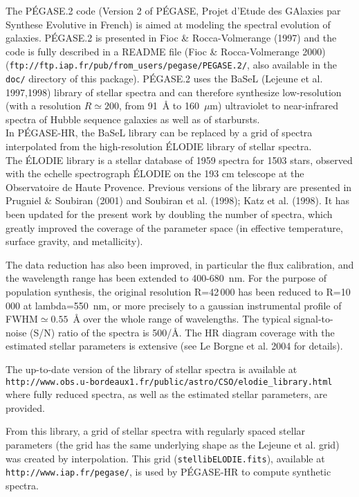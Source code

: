 \documentclass[11pt,fleqn]{article}
\begin{document}
The P\'EGASE.2 code (Version 2 of P\'EGASE, Projet d'Etude des GAlaxies
par Synthese Evolutive in French) is aimed at modeling the spectral
evolution of galaxies. P\'EGASE.2 is presented in Fioc \&
Rocca-Volmerange (1997) and the
code is fully described in a README file (Fioc \& Rocca-Volmerange 2000) 
(\texttt{ftp://ftp.iap.fr/pub/from\_users/pegase/PEGASE.2/}, also available in the \texttt{doc/} directory of this package).
P\'EGASE.2 uses the BaSeL (Lejeune et al. 1997,1998) library of stellar
spectra and can therefore synthesize low-resolution (with a resolution $R \simeq 200$, from 91~\AA{} to 160~$\mu$m)
ultraviolet to near-infrared spectra of Hubble sequence galaxies as
well as of starbursts.\\

In P\'EGASE-HR, the BaSeL library can be replaced by a grid of spectra
interpolated from the high-resolution \'ELODIE library of stellar spectra.\\

The \'ELODIE library is a stellar database of 1959 spectra for 1503
stars, observed with the echelle spectrograph \'ELODIE on the 193 cm
telescope at the Observatoire de Haute Provence. Previous versions of
the library are presented in Prugniel \& Soubiran (2001) and Soubiran
et al. (1998); Katz et al. (1998).  It has been updated for the
present work by doubling the number of spectra, which greatly improved
the coverage of the parameter space (in effective temperature, surface
gravity, and metallicity).

The data reduction has also been improved, in particular the flux
calibration, and the wavelength range has been extended to
400-680~nm.  For the purpose of population synthesis, the
original resolution R=42\,000 has been reduced to R=10\,000 at
lambda=550~nm, or more precisely to a gaussian instrumental
profile of FWHM$\simeq 0.55$~\AA{} over the whole range of
wavelengths.  The typical signal-to-noise (S/N) ratio of the
spectra is 500/\AA{}. The HR diagram coverage with the estimated
stellar parameters is extensive (see Le Borgne et al. 2004 for
details).

The up-to-date version of the library of stellar spectra is
available at\\
\texttt{http://www.obs.u-bordeaux1.fr/public/astro/CSO/elodie\_library.html}
where fully reduced spectra, as well as the estimated stellar
parameters, are provided.

From this library, a grid of stellar spectra with regularly
spaced stellar parameters (the grid has the same underlying
shape as the Lejeune et al. grid) was created by
interpolation. This grid (\texttt{stellibELODIE.fits}),
available at \texttt{http://www.iap.fr/pegase/}, 
is used by P\'EGASE-HR to compute  synthetic spectra.
\end{document}
